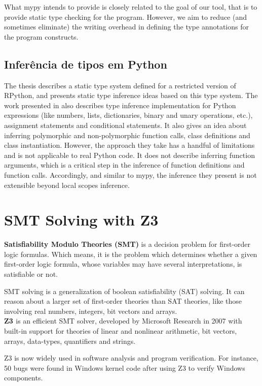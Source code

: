 What mypy intends to provide is closely related to the goal of our tool, that is to provide static type checking for the program. However, we aim to reduce (and sometimes eliminate) the writing overhead in defining the type annotations for the program constructs.


\subsection{Inferência de tipos em Python \cite{porto}}
The thesis \cite{porto} describes a static type system defined for a restricted version of RPython, and presents static type inference ideas based on this type system. The work presented in \cite{porto} also describes type inference implementation for Python expressions (like numbers, lists, dictionaries, binary and
unary operations, etc.), assignment statements and conditional statements. It also gives an idea about inferring polymorphic and non-polymorphic function calls, class definitions and class instantiation. However, the approach they take has a handful of limitations and is not applicable to real Python code. It does not describe inferring function arguments, which is a critical step in the inference of function definitions and function calls. Accordingly, and similar to mypy, the inference they present is not extensible beyond local scopes inference.


\section{SMT Solving with Z3 \cite{z3}}
\textbf{Satisfiability Modulo Theories (SMT)} is a decision problem for first-order logic formulas. Which means, it is the problem which determines whether a given first-order logic formula, whose variables may have several interpretations, is satisfiable or not.

SMT solving is a generalization of boolean satisfiability (SAT) solving. It can reason about a larger set of first-order theories than SAT theories, like those involving real numbers, integers, bit vectors and arrays.\\

\textbf{Z3 \cite{z3}} is an efficient SMT solver, developed by Microsoft Research in 2007 with built-in support for theories of linear and nonlinear arithmetic, bit vectors, arrays, data-types, quantifiers and strings.

Z3 is now widely used in software analysis and program verification. For instance, 50 bugs were found in Windows kernel code after using Z3 to verify Windows components.\\

